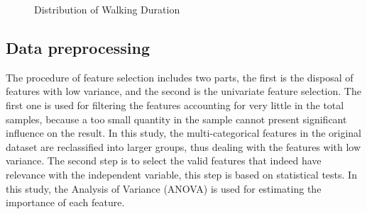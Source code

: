 \documentclass[sustainability,article,submit,moreauthors,pdftex,10pt,a4paper]{Definitions/mdpi}
\begin{document}
%
\begin{figure}[h]
	\caption{Distribution of Walking Duration}
	\label{fig:DurationDistribution}
	\centering
\end{figure}

\subsection{Data preprocessing}
The procedure of feature selection includes two parts, the first is the disposal of features with low variance, and the second is the univariate feature selection. The first one is used for filtering the features accounting for very little in the total samples, because a too small quantity in the sample cannot present significant influence on the result. In this study, the multi-categorical features in the original dataset are reclassified into larger groups, thus dealing with the features with low variance. The second step is to select the valid features that indeed have relevance with the independent variable, this step is based on statistical tests. In this study, the Analysis of Variance (ANOVA) is used for estimating the importance of each feature.
\end{document}
